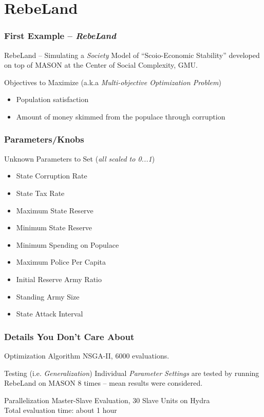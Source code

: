 \documentclass{beamer}
\begin{document}
\section{RebeLand}
\begin{frame}	
	\frametitle{First Example -- \textit{RebeLand}}
	\begin{block}{RebeLand -- Simulating a \emph{Society}}
		Model of ``Scoio-Economic Stability'' developed on top of MASON at the Center of Social Complexity, GMU.
	\end{block}
	\begin{block}{Objectives to Maximize (a.k.a \emph{Multi-objective Optimization Problem})}
		\begin{itemize}
			\item Population satisfaction
			\item Amount of money skimmed from the populace through corruption
		\end{itemize}		
	\end{block}
\end{frame}
\begin{frame}
	\frametitle{Parameters/Knobs}
	\begin{block}{Unknown Parameters to Set (\emph{all scaled to 0...1})}
		 \begin{itemize}
			\item State Corruption Rate
			\item State Tax Rate
			\item Maximum State Reserve
			\item Minimum State Reserve
			\item Minimum Spending on Populace
			\item Maximum Police Per Capita
			\item Initial Reserve Army Ratio
			\item Standing Army Size
			\item State Attack Interval
		 \end{itemize}
	\end{block}
\end{frame}
\begin{frame}
	\frametitle{Details You Don't Care About}
	\begin{block}{Optimization Algorithm}
		NSGA-II, 6000 evaluations.
	\end{block}
	\begin{block}{Testing (i.e. \textit{Generalization})}
		Individual \textit{Parameter Settings} are tested by running RebeLand on MASON 8 times -- mean results were considered.
	\end{block}
	\begin{block}{Parallelization}
		Master-Slave Evaluation, 30 Slave Units on Hydra\\
		Total evaluation time: about 1 hour
	\end{block}
\end{frame}
\end{document}
